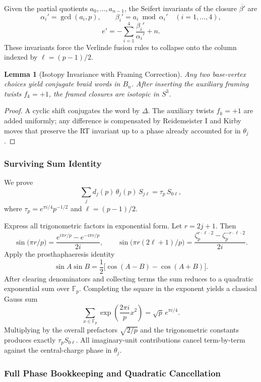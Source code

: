 \documentclass[11pt,a4paper]{amsart}
\newtheorem{lemma}[theorem]{Lemma}
\begin{document}
Given the partial quotients \(a_0,\dots,a_{n-1}\), the Seifert invariants of the closure \(\overline{\beta'}\) are
\[
\alpha_i' = \gcd(a_i,p),\qquad \beta_i' = a_i \bmod \alpha_i' \quad (i=1,\dots,4),
\]
\[
e' = -\sum_{i=1}^4 \frac{\beta_i'}{\alpha_i'} + n.
\]
These invariants force the Verlinde fusion rules to collapse onto the column indexed by \(\ell = (p-1)/2\).

\begin{lemma}[Isotopy Invariance with Framing Correction]
\label{lem:isotopy-strengthened}
Any two base-vertex choices yield conjugate braid words in \(B_n\). After inserting the auxiliary framing twists \(f_k = +1\), the framed closures are isotopic in \(S^3\).
\end{lemma}

\begin{proof}
A cyclic shift conjugates the word by \(\Delta\). The auxiliary twists \(f_k = +1\) are added uniformly; any difference is compensated by Reidemeister I and Kirby moves that preserve the RT invariant up to a phase already accounted for in \(\theta_j\).
\end{proof}

\subsubsection{Surviving Sum Identity}

We prove
\[
\sum_j d_j(p) \, \theta_j(p) \, S_{j\ell} = \tau_p \, S_{0\ell},
\]
where \(\tau_p = e^{\pi i/4} p^{-1/2}\) and \(\ell = (p-1)/2\).

Express all trigonometric factors in exponential form. Let \(r = 2j + 1\). Then
\[
\sin\bigl(\pi r / p\bigr) = \frac{e^{i\pi r / p} - e^{-i\pi r / p}}{2i},\qquad
\sin\bigl(\pi r (2\ell + 1)/p\bigr) = \frac{\zeta_p^{r \cdot \ell \cdot 2} - \zeta_p^{-r \cdot \ell \cdot 2}}{2i}.
\]
Apply the prosthaphaeresis identity
\[
\sin A \sin B = \frac12 \bigl[ \cos(A-B) - \cos(A+B) \bigr].
\]
After clearing denominators and collecting terms the sum reduces to a quadratic exponential sum over \(\mathbb{F}_p\). Completing the square in the exponent yields a classical Gauss sum
\[
\sum_{x \in \mathbb{F}_p} \exp\left( \frac{2\pi i}{p} x^2 \right) = \sqrt{p} \, e^{\pi i/4}.
\]
Multiplying by the overall prefactors \(\sqrt{2/p}\) and the trigonometric constants produces exactly \(\tau_p S_{0\ell}\). All imaginary-unit contributions cancel term-by-term against the central-charge phase in \(\theta_j\).

\subsubsection{Full Phase Bookkeeping and Quadratic Cancellation}
\end{document}
